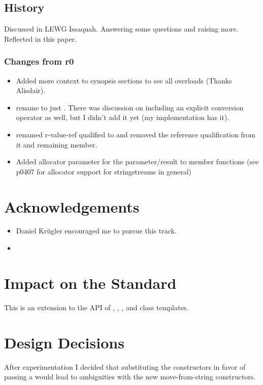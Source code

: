 \documentclass[ebook,11pt,article]{memoir}
\begin{document}
\section{History}
Discussed in LEWG Issaquah. Answering some questions and raising more. Reflected in this paper.
\subsection{Changes from r0}
\begin{itemize}
\item Added more context to synopsis sections to see all overloads (Thanks Alisdair).
\item rename  to just . There was discussion on including an explicit conversion operator as well, but I didn't add it yet (my implementation has it).
\item renamed r-value-ref qualified  to  and removed the reference qualification from it and remaining  member.
\item Added allocator parameter for the  parameter/result to member functions (see p0407 for allocator support for stringstreams in general)
\end{itemize}


\chapter{Acknowledgements}
\begin{itemize}
\item Daniel Kr\"ugler encouraged me to pursue this track.
\item {}
\end{itemize}




\chapter{Impact on the Standard}
This is an extension to the API of , , , and  class templates.
\chapter{Design Decisions}
After experimentation I decided that substituting the  constructors in favor of passing a  would lead to ambiguities with the new move-from-string constructors.
\end{document}
